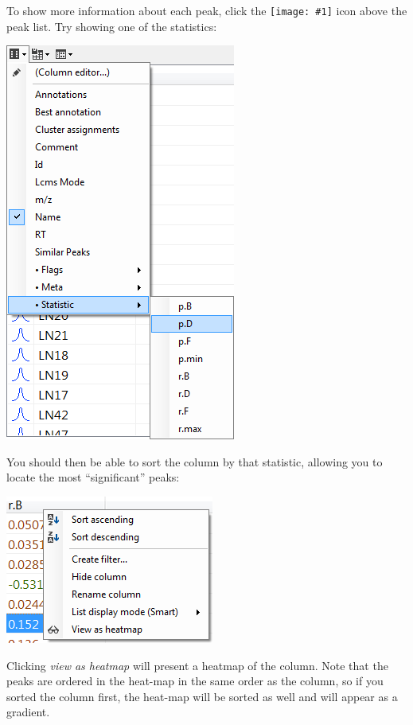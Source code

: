 \documentclass[11pt,a4paper]{article}
\newcommand{\menu}[1]{ \flqq\textit{#1}\frqq}
\newcommand{\icon}[1]{\texttt{[image: \#1]}}
\begin{document}
To show more information about each peak, click the \icon{columns} icon above the peak list. Try showing one of the statistics:

\begin{center}
	\includegraphics[max width=0.5\linewidth]{"Images/userguide/column edit"}
\end{center}

You should then be able to sort the column by that statistic, allowing you to locate the most ``significant'' peaks:

\begin{center}
	\includegraphics[max width=0.5\linewidth]{"Images/userguide/column header"}
\end{center}

Clicking \menu{view as heatmap} will present a heatmap of the column. Note that the peaks are ordered in the heat-map in the same order as the column, so if you sorted the column first, the heat-map will be sorted as well and will appear as a gradient.
\end{document}
